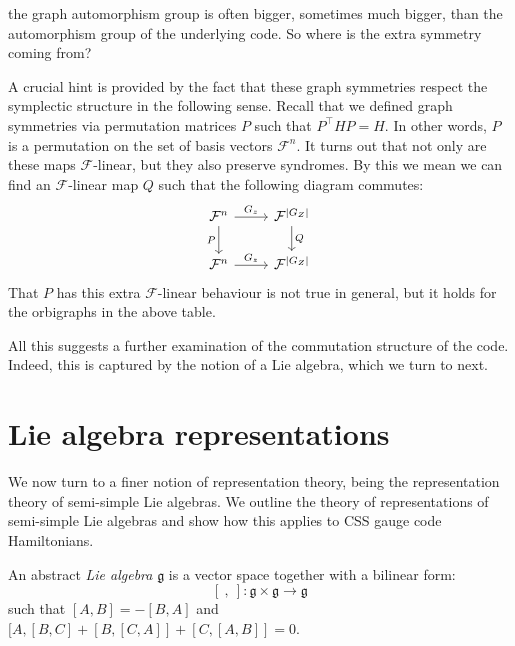 \documentclass[12pt]{article}
\newcommand{\Field}{\mathcal{F}}
\renewenvironment{framed}
{\begin{samepage}
\MakeFramed{\hsize0.8\linewidth\advance\hsize-\width\FrameRestore}}
{\endMakeFramed\end{samepage}}
\begin{document}
\begin{framed}
the graph automorphism group is
often bigger, sometimes much bigger, than the automorphism group of
the underlying code.
So where is the extra symmetry coming from?
\end{framed}

A crucial hint is provided by the fact that these graph
symmetries respect the symplectic structure in the following sense.
Recall that we defined graph symmetries via permutation
matrices $P$ such that $P^{\top}HP=H.$
In other words, $P$ is a permutation on the set
of basis vectors $\Field^n.$
It turns out that not only
are these maps $\Field$-linear, but they also 
preserve syndromes. 
By this we mean we can find an $\Field$-linear
map $Q$ such that the following diagram commutes:
\[
\begin{tikzcd}
\Field^n \arrow{r}{G_z} \arrow[swap]{d}{P} & \Field^{|G_Z|} \arrow{d}{Q} \\
\Field^n \arrow{r}{G_z} & \Field^{|G_Z|} 
\end{tikzcd}
\]
That $P$ has this extra $\Field$-linear behaviour 
is not true in general, but it holds for the orbigraphs in the above
table.

All this suggests a further examination of the commutation structure
of the code.
Indeed, this is captured by the notion of a Lie algebra, which we turn to next.





%

\section{Lie algebra representations}


\def\lie{\mathfrak{g}}
\def\lieh{\mathfrak{h}}
\def\sl{\mathfrak{sl}}

We now turn to a finer notion of representation theory,
being the representation theory of semi-simple Lie algebras.
We outline the theory of representations
of semi-simple Lie algebras \cite{Fulton2013} and show
how this applies to CSS gauge code Hamiltonians.

An abstract 
\emph{Lie algebra} $\lie$ is 
a vector space together with a bilinear form:
$$
    [\ ,\  ] : \lie \times \lie \to \lie
$$
such that $[A,B] = -[B,A]$ and
$[A,[B,C]+[B,[C,A]]+[C,[A,B]]=0.$
\end{document}
